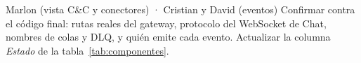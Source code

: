 \begin{pendiente}{Marlon (vista C\&C y conectores) · Cristian y David (eventos)}
Confirmar contra el código final: rutas reales del gateway, protocolo del WebSocket de Chat,
nombres de colas y DLQ, y quién emite cada evento. Actualizar la columna \emph{Estado}
de la tabla~\ref{tab:componentes}.
\end{pendiente}

